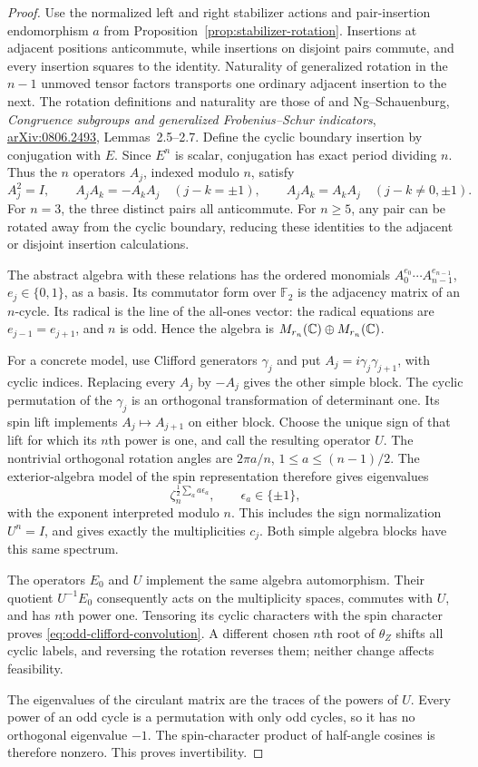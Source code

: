 \begin{proof}
Use the normalized left and right stabilizer actions and pair-insertion
endomorphism $a$ from Proposition~\ref{prop:stabilizer-rotation}.
Insertions at adjacent positions anticommute, while insertions on disjoint
pairs commute, and every insertion squares to the identity. Naturality
of generalized rotation in the $n-1$ unmoved tensor factors transports
one ordinary adjacent insertion to the next. The rotation definitions
and naturality are those of \cite{NSpiv} and Ng--Schauenburg,
\emph{Congruence subgroups and generalized Frobenius--Schur indicators},
\href{https://arxiv.org/abs/0806.2493}{arXiv:0806.2493}, Lemmas~2.5--2.7.
Define the cyclic boundary insertion by conjugation with $E$. Since
$E^n$ is scalar, conjugation has exact period dividing $n$.
Thus the $n$ operators $A_j$, indexed modulo $n$, satisfy
\[
 A_j^2=I,\qquad
 A_jA_k=-A_kA_j\quad(j-k=\pm1),\qquad
 A_jA_k=A_kA_j\quad(j-k\ne0,\pm1).
\]
For $n=3$, the three distinct pairs all anticommute. For $n\ge5$, any
pair can be rotated away from the cyclic boundary, reducing these
identities to the adjacent or disjoint insertion calculations.

The abstract algebra with these relations has the ordered monomials
$A_0^{e_0}\cdots A_{n-1}^{e_{n-1}}$, $e_j\in\{0,1\}$, as a basis.
Its commutator form over $\mathbb F_2$ is the adjacency matrix of an
$n$-cycle. Its radical is the line of the all-ones vector: the radical
equations are $e_{j-1}=e_{j+1}$, and $n$ is odd. Hence the algebra is
$M_{r_n}(\mathbb C)\oplus M_{r_n}(\mathbb C)$.

For a concrete model, use Clifford generators $\gamma_j$ and put
$A_j=i\gamma_j\gamma_{j+1}$, with cyclic indices. Replacing every
$A_j$ by $-A_j$ gives the other simple block. The cyclic permutation
of the $\gamma_j$ is an orthogonal transformation of determinant one.
Its spin lift implements $A_j\mapsto A_{j+1}$ on either block.
Choose the unique sign of that lift for which its $n$th power is one,
and call the resulting operator $U$. The nontrivial orthogonal
rotation angles are $2\pi a/n$, $1\le a\le(n-1)/2$. The exterior-algebra
model of the spin representation therefore gives eigenvalues
\[
 \zeta_n^{\frac12\sum_a a\epsilon_a},\qquad \epsilon_a\in\{\pm1\},
\]
with the exponent interpreted modulo $n$. This includes the sign
normalization $U^n=I$, and gives exactly the multiplicities $c_j$.
Both simple algebra blocks have this same spectrum.

The operators $E_0$ and $U$ implement the same algebra automorphism.
Their quotient $U^{-1}E_0$ consequently acts on the multiplicity spaces,
commutes with $U$, and has $n$th power one. Tensoring its cyclic
characters with the spin character proves
\eqref{eq:odd-clifford-convolution}. A different chosen $n$th root of
$\theta_Z$ shifts all cyclic labels, and reversing the rotation reverses
them; neither change affects feasibility.

The eigenvalues of the circulant matrix are the traces of the powers
of $U$. Every power of an odd cycle is a permutation with only odd
cycles, so it has no orthogonal eigenvalue $-1$. The spin-character
product of half-angle cosines is therefore nonzero. This proves
invertibility.
\end{proof}

